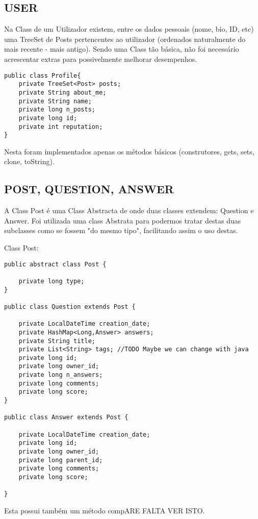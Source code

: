 \documentclass[letterpaper, 10 pt, conference]{IEEEtran}  %
\begin{document}
\subsection{USER}

Na Class de um Utilizador existem, entre os dados pessoais (nome, bio, ID, etc) uma TreeSet de Posts
pertencentes ao utilizador (ordenados naturalmente do mais recente - mais antigo).
Sendo uma Class tão básica, não foi necessário acrescentar extras para possivelmente melhorar desempenhos.

\begin{lstlisting}
public class Profile{
    private TreeSet<Post> posts;
    private String about_me;
    private String name;
    private long n_posts;
    private long id;
    private int reputation;
}
\end{lstlisting}

Nesta foram implementados apenas os métodos básicos (construtores, gets, sets, clone, toString).

\subsection{POST, QUESTION, ANSWER}

A Class Post é uma Class Abstracta de onde duas classes extendem: Question e Answer.
Foi utilizada uma class Abstrata para podermos tratar destas duas subclasses como se fossem
"do mesmo tipo", facilitando assim o uso destas.

Class Post:
\begin{lstlisting}
public abstract class Post {

    private long type;
}

public class Question extends Post {

    private LocalDateTime creation_date;
    private HashMap<Long,Answer> answers;
    private String title;
    private List<String> tags; //TODO Maybe we can change with java
    private long id;
    private long owner_id;
    private long n_answers;
    private long comments;
    private long score;
}

public class Answer extends Post {

    private LocalDateTime creation_date;
    private long id;
    private long owner_id;
    private long parent_id;
    private long comments;
    private long score;

}
\end{lstlisting}
Esta possui também um método compARE FALTA VER ISTO.
\end{document}
